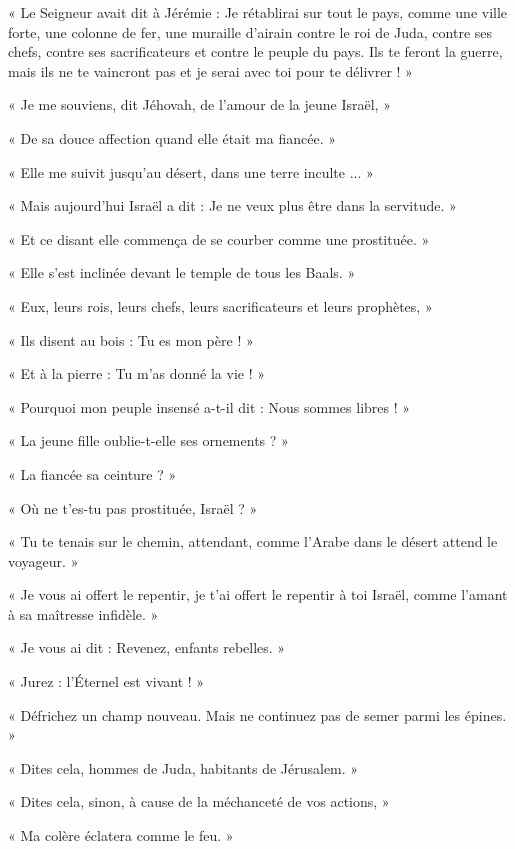 \documentclass[a4paper, 11pt, oneside, polutonikogreek, french]{article}
\begin{document}
\bigskip
\centerline{\EightStarTaper}
\centerline{\EightStarTaper\EightStarTaper}
\bigskip

« Le Seigneur avait dit à Jérémie : Je rétablirai sur tout le pays, comme une ville forte, une colonne de fer, une muraille d'airain contre le roi de Juda, contre ses chefs, contre ses sacrificateurs et contre le peuple du pays. Ils te feront la guerre, mais ils ne te vaincront pas et je serai avec toi pour te délivrer ! »

« Je me souviens, dit Jéhovah, de l'amour de la jeune Israël, »

« De sa douce affection quand elle était ma fiancée. »

« Elle me suivit jusqu'au désert, dans une terre inculte ... »

« Mais aujourd'hui Israël a dit : Je ne veux plus être dans la servitude. »

« Et ce disant elle commença de se courber comme une prostituée. »

« Elle s'est inclinée devant le temple de tous les Baals. »

« Eux, leurs rois, leurs chefs, leurs sacrificateurs et leurs prophètes, »

« Ils disent au bois : Tu es mon père ! »

« Et à la pierre : Tu m'as donné la vie ! »

« Pourquoi mon peuple insensé a-t-il dit : Nous sommes libres ! »

« La jeune fille oublie-t-elle ses ornements ? »

« La fiancée sa ceinture ? »

« Où ne t'es-tu pas prostituée, Israël ? »

« Tu te tenais sur le chemin, attendant, comme l'Arabe dans le désert attend le voyageur. »

« Je vous ai offert le repentir, je t'ai offert le repentir à toi Israël, comme l'amant à sa maîtresse infidèle. »

« Je vous ai dit : Revenez, enfants rebelles. »

« Jurez : l'Éternel est vivant ! »

« Défrichez un champ nouveau. Mais ne continuez pas de semer parmi les épines. »

« Dites cela, hommes de Juda, habitants de Jérusalem. »

« Dites cela, sinon, à cause de la méchanceté de vos actions, »

« Ma colère éclatera comme le feu. »
\end{document}
